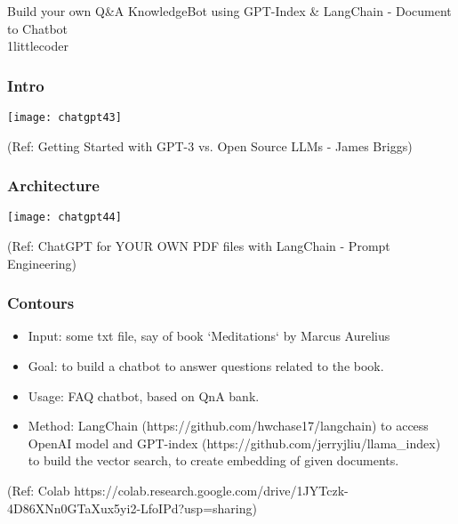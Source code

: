 \begin{frame}[fragile]\frametitle{}
\begin{center}
{\Large Build your own Q\&A KnowledgeBot using GPT-Index \& LangChain - Document to Chatbot\\ 1littlecoder}
\end{center}
\end{frame}

\begin{frame}[fragile]\frametitle{Intro}

\begin{center}
\texttt{[image: chatgpt43]}

{\tiny (Ref: Getting Started with GPT-3 vs. Open Source LLMs - James Briggs)}

\end{center}		


\end{frame}

\begin{frame}[fragile]\frametitle{ Architecture}

\begin{center}
\texttt{[image: chatgpt44]}

{\tiny (Ref: ChatGPT for YOUR OWN PDF files with LangChain - Prompt Engineering)}

\end{center}

\end{frame}


\begin{frame}[fragile]\frametitle{Contours}

\begin{itemize}
\item Input: some txt file, say of book `Meditations` by Marcus Aurelius
\item Goal: to build a chatbot to answer questions related to the book.
\item Usage: FAQ chatbot, based on QnA bank.
\item Method: LangChain (https://github.com/hwchase17/langchain) to access OpenAI model and GPT-index (https://github.com/jerryjliu/llama\_index) to build the vector search, to create embedding of given documents.
\end{itemize}	 

{\tiny (Ref: Colab https://colab.research.google.com/drive/1JYTczk-4D86XNn0GTaXux5yi2-LfoIPd?usp=sharing)}

\end{frame}


